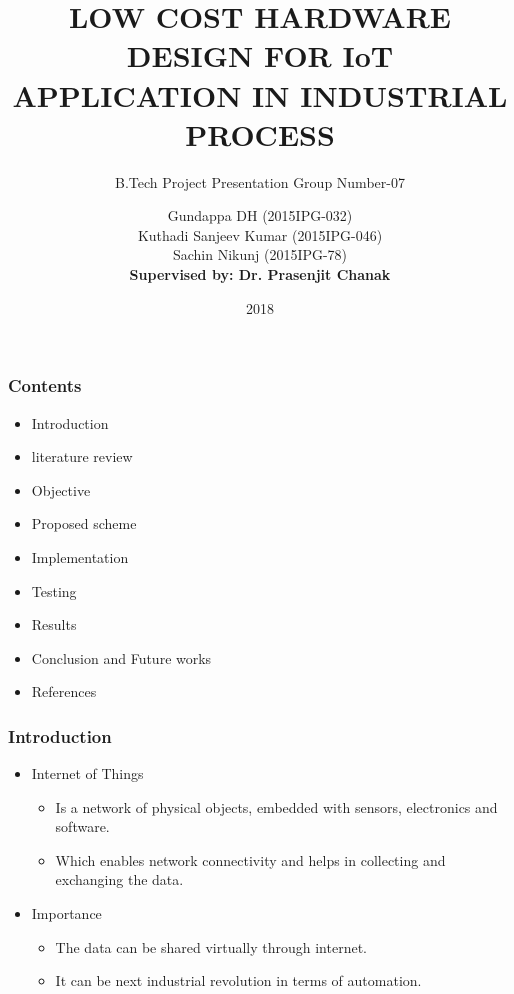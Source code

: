 \documentclass{beamer}
\title[]{LOW COST HARDWARE DESIGN FOR IoT
APPLICATION IN INDUSTRIAL PROCESS}
\author{B.Tech Project Presentation Group Number-07}
\author{Gundappa DH (2015IPG-032)\\
        Kuthadi Sanjeev Kumar (2015IPG-046)\\
        Sachin Nikunj (2015IPG-78)\\
\vspace{6mm}
\textbf{Supervised by: Dr. Prasenjit Chanak}}
\institute[]{
	
	ABV-Indian Institute of Information Technology and\\
	Management, Gwalior
}
\date{2018}
\begin{document}
	\frame{\titlepage}
	
	
	\begin{frame}\frametitle{Contents}
	\begin{itemize}
		\item	Introduction
		\item   literature review 
		\item   Objective 
		\item	Proposed scheme
		\item   Implementation 
		\item   Testing
		\item	Results
		\item   Conclusion and Future works
		\item   References
	\end{itemize}
\end{frame}
\begin{frame}\frametitle{Introduction}
\begin{itemize}
\item Internet of Things
\begin{itemize}
	\item Is a network of physical objects, embedded with sensors, electronics and software.	 
	\item Which enables network connectivity and helps in collecting and exchanging the data.	  
\end{itemize}
\item Importance
\begin{itemize}
\item The data can be shared virtually through internet. 
\item It can be next industrial revolution in terms of automation.
\end{itemize}
\end{itemize}
\end{frame}
\end{document}
